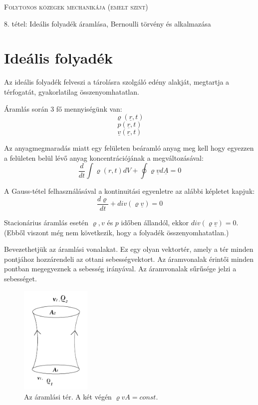 \documentclass[a4paper,titlepage,12pt]{article}
\begin{document}
	\begin{centering}
		\scshape\LARGE Folytonos közegek mechanikája (emelt szint) \par
		\vspace{1cm}
		
		\large 8. tétel: Ideális folyadék áramlása, Bernoulli törvény és alkalmazása
	\end{centering}

\part*{Ideális folyadék}

Az ideális folyadék felveszi a tárolásra szolgáló edény alakját, megtartja a térfogatát, gyakorlatilag összenyomhatatlan. 

Áramlás során 3 fő mennyiségünk van: $$\varrho(\underline{r},t)$$ $$p(\underline{r},t)$$ $$\underline{v}(\underline{r},t) $$

\vspace{0.25 cm}
Az anyagmegmaradás miatt egy felületen beáramló anyag meg kell hogy egyezzen a felületen belül lévő anyag koncentrációjának a megváltozásával: $$ \frac{d}{dt}\int\varrho(r,t)dV+\oint\varrho \underline{v}d\underline{A}=0 $$

A Gauss-tétel felhasználásával a kontinuitási egyenletre az alábbi képletet kapjuk: $$\frac{d\varrho}{dt}+div(\varrho\underline{v})=0 $$

Stacionárius áramlás esetén $\varrho , v$ és $p$ időben állandól, ekkor $div(\varrho\underline{v})=0$. (Ebből viszont még nem következik, hogy a folyadék összenyomhatatlan.)

\vspace{0.25 cm}
Bevezethetjük az áramlási vonalakat. Ez egy olyan vektortér, amely a tér minden pontjához hozzárendeli az ottani sebességvektort. Az áramvonalak érintői minden pontban megegyeznek a sebesség irányával. Az áramvonalak sűrűsége jelzi a sebességet. 

\begin{figure}[H]
	\begin{center}
		\includegraphics[width=0.3\textwidth]{tetel8.png}
		\caption{Az áramlási tér. A két végén $\varrho vA=const.$}
	\end{center}
\end{figure}
\end{document}
